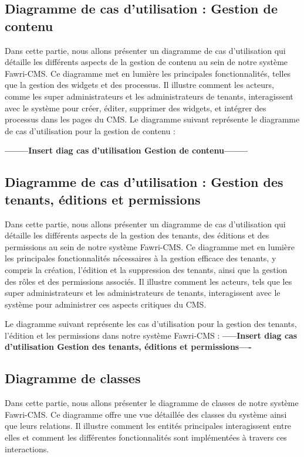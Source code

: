 \subsection{Diagramme de cas d’utilisation : Gestion de contenu}
\hspace{\parindent}Dans cette partie, nous allons présenter un diagramme de cas d'utilisation qui détaille les différents aspects de la gestion de contenu au sein de notre système Fawri-CMS. Ce diagramme met en lumière les principales fonctionnalités, telles que la gestion des widgets et des processus. Il illustre comment les acteurs, comme les super administrateurs et les administrateurs de tenants, interagissent avec le système pour créer, éditer, supprimer des widgets, et intégrer des processus dans les pages du CMS. Le diagramme suivant représente le diagramme de cas d'utilisation pour la gestion de contenu :

\textbf{--------Insert diag cas d'utilisation Gestion de contenu--------}




\subsection{Diagramme de cas d'utilisation : Gestion des tenants, éditions et permissions}

\hspace{\parindent}Dans cette partie, nous allons présenter un diagramme de cas d'utilisation qui détaille les différents aspects de la gestion des tenants, des éditions et des permissions au sein de notre système Fawri-CMS. Ce diagramme met en lumière les principales fonctionnalités nécessaires à la gestion efficace des tenants, y compris la création, l'édition et la suppression des tenants, ainsi que la gestion des rôles et des permissions associés. Il illustre comment les acteurs, tels que les super administrateurs et les administrateurs de tenants, interagissent avec le système pour administrer ces aspects critiques du CMS.

Le diagramme suivant représente les cas d'utilisation pour la gestion des tenants, l'édition et les permissions dans notre système Fawri-CMS :
\textbf{-----Insert diag cas d'utilisation Gestion des tenants, éditions et permissions----}






\subsection{Diagramme de classes}
\hspace{\parindent}Dans cette partie, nous allons présenter le diagramme de classes de notre système Fawri-CMS. Ce diagramme offre une vue détaillée des classes du système ainsi que leurs relations. Il illustre comment les entités principales interagissent entre elles et comment les différentes fonctionnalités sont implémentées à travers ces interactions.

